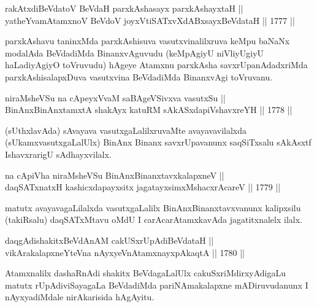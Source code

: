 \begin{shl}
rakAtxdiBeVdatoV BeVdaH parxkAshasayx parxkAshayxtaH || \\
yatheYvamAtamxnoV BeVdoV joyxVtiSATxvXdABxsayxBeVdataH \hfill || 1777 ||  
\end{shl}

\begin{artha}
parxkAshavu taninxMda parxkAshisuva vasutxvinalilxruva keMpu baNaNx
modalAda BeVdadiMda BinanxvAguvudu (keMpAgiyU niVliyUgiyU haLadiyAgiyO
toVruvudu) hAgeye Atamxnu parxkAsha savxrUpanAdadxriMda
parxkAshisalapxDuva vasutxvina BeVdadiMda BinanxvAgi toVruvanu.
\end{artha}


\begin{shl}
niraMsheVSu na cApeyxVvaM saBAgeVSivxva vasutxSu || \\
BinAnxBinAnxtamxtA shakAyx katuRM sAkASxdapiVshavxreYH \hfill || 1778 ||  
\end{shl}

\begin{artha}
(sUthxlavAda) sAvayava vasutxgaLalilxruvaMte avayavavilalxda
(sUkamxvasutxgaLalUlx) BinAnx Binanx savxrUpavanunx saqSiTxsalu
sAkAsxtf IshavxrarigU sAdhayxvilalx.
\end{artha}

\begin{shl}
na cApiVha niraMsheVSu BinAnxBinanxtavxkalapxneV || \\
daqSATxnatxH kashicxdapayxsitx jagatayxsimxMshacxrAcareV \hfill || 1779 ||  
\end{shl}

\begin{artha}
matutx avayavagaLilalxda vasutxgaLalilx BinAnxBinanxtavxvanunx
kalipxsilu (takiRsalu) daqSATxMtavu oMdU I carAcarAtamxkavAda
jagatitxnalelx ilalx.
\end{artha}

\begin{shl}
daqgAdishakitxBeVdAnAM cakUSxrUpAdiBeVdataH || \\
vikArakalapxneYteVna nAyxyeVnA\s \s tamxnayxpAkaqtA \hfill || 1780 || 
\end{shl}

\begin{artha}
Atamxnalilx dashaRnAdi shakitx BeVdagaLalUlx cakuSxriMdirxyAdigaLu
matutx rUpAdiviSayagaLa BeVdadiMda pariNAmakalapxne mADiruvudanunx I
nAyxyadiMdale nirAkarisida hAgAyitu.
\end{artha}


